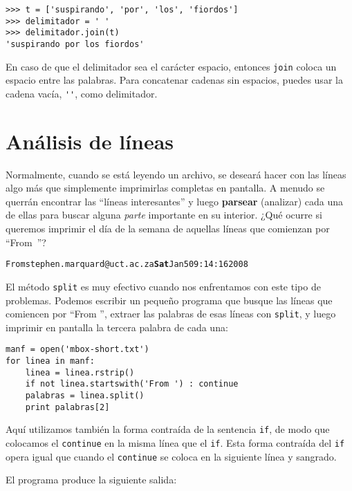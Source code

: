 
\beforeverb
\begin{verbatim}
>>> t = ['suspirando', 'por', 'los', 'fiordos']
>>> delimitador = ' '
>>> delimitador.join(t)
'suspirando por los fiordos'
\end{verbatim}
\afterverb
%
En caso de que el delimitador sea el carácter espacio,
entonces {\tt join} coloca un espacio entre las palabras. Para concatenar
cadenas sin espacios, puedes usar la cadena vacía,
\verb"''", como delimitador.



\section{Análisis de líneas}

Normalmente, cuando se está leyendo un archivo,
se deseará hacer con las líneas algo más que simplemente
imprimirlas completas en pantalla. A menudo se querrán encontrar
las ``líneas interesantes'' y luego {\bf parsear} (analizar) cada una de ellas
para buscar alguna \emph{parte} importante en su interior. ¿Qué ocurre si queremos
imprimir el día de la semana de aquellas líneas que comienzan por \mbox{``From ''?}

\beforeverb
\begin{alltt}
From stephen.marquard@uct.ac.za {\bf Sat} Jan  5 09:14:16 2008
\end{alltt}
\afterverb

El método {\tt split} es muy efectivo cuando nos enfrentamos con este
tipo de problemas.
Podemos escribir un pequeño programa que busque las líneas que
comiencen por ``From '', extraer las palabras de esas líneas con {\tt split},
y luego imprimir en pantalla la tercera palabra de cada una:

\beforeverb
\begin{verbatim}
manf = open('mbox-short.txt')
for linea in manf:
    linea = linea.rstrip()
    if not linea.startswith('From ') : continue
    palabras = linea.split()
    print palabras[2]
\end{verbatim}
\afterverb
%
Aquí utilizamos también la forma contraída de la sentencia
{\tt if}, de modo que colocamos el {\tt continue} en la
misma línea que el {\tt if}. Esta forma contraída
del {\tt if} opera igual que cuando el
{\tt continue} se coloca en la siguiente línea y sangrado.

El programa produce la siguiente salida:

